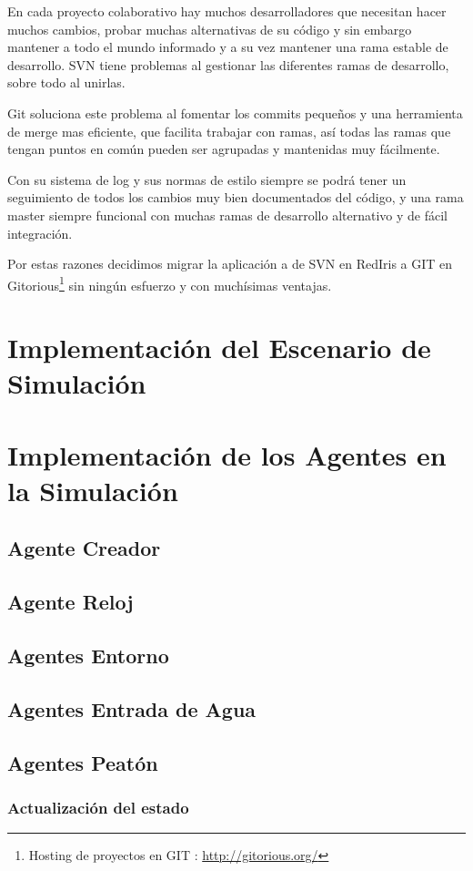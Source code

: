 En cada proyecto colaborativo hay muchos desarrolladores que necesitan hacer
muchos cambios, probar muchas alternativas de su código y sin embargo mantener
a todo el mundo informado y a su vez mantener una rama estable de desarrollo.
SVN tiene problemas al gestionar las diferentes ramas de desarrollo, sobre todo
al unirlas.

Git soluciona este problema al fomentar los commits pequeños y una herramienta
de merge mas eficiente, que facilita trabajar con ramas, así todas las ramas
que tengan puntos en común pueden ser agrupadas y mantenidas muy fácilmente.

Con su sistema de log y sus normas de estilo siempre se podrá tener un
seguimiento de todos los cambios muy bien documentados del código, y una rama
master siempre funcional con muchas ramas de desarrollo alternativo y de fácil
integración.

Por estas razones decidimos migrar la aplicación a de SVN en RedIris a GIT en
Gitorious\footnote{Hosting de proyectos en GIT :
\url{http://gitorious.org/}} sin ningún esfuerzo y con muchísimas ventajas.
\section*{Implementación del Escenario de Simulación}
\section*{Implementación de los Agentes en la Simulación}
\subsection*{Agente Creador}
\subsection*{Agente Reloj}
\subsection*{Agentes Entorno}
\subsection*{Agentes Entrada de Agua}
\subsection*{Agentes Peatón}
\subsubsection*{Actualización del estado}

